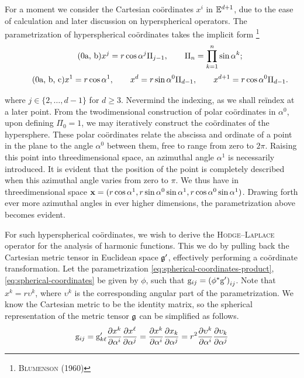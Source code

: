For a moment we consider the Cartesian coördinates $x^{i}$ in $\mathbb{E}^{d+1}$, due to the ease of calculation and later discussion on hyperspherical operators.
The parametrization of hyperspherical coördinates takes the implicit form%
\footnote{%
  \cite{blumenson1960derivation} \textsc{Blumenson} (1960)
}
%
\begin{subequations}\label{eq:spherical-coordinates-product}
  \begin{equation}\tag{\theequation{a, b}}
    x^{j} = r \cos{\alpha^j} \Pi_{j-1}, \qquad \Pi_n = \prod_{k = 1}^{n} \sin{\alpha^k};
  \end{equation}
\end{subequations}
%
\begin{subequations}\label{eq:spherical-coordinates}
  \begin{equation}\tag{\theequation{a, b, c}}
    x^1 = r \cos{\alpha^1}, \qquad x^{d} = r \sin{\alpha^{0}} \Pi_{d-1}, \qquad x^{d+1} = r \cos{\alpha^{0}} \Pi_{d-1}.
  \end{equation}
\end{subequations}

\noindent
where $j \in \{ 2, \dots, d-1 \}$ for $d \geq 3$.
Nevermind the indexing, as we shall reïndex at a later point.
From the twodimensional construction of polar coördinates in $\alpha^0$, upon defining $\Pi_0 = 1$, we may iteratively construct the coördinates of the hypersphere.
These polar coördinates relate the abscissa and ordinate of a point in the plane to the angle $\alpha^0$ between them, free to range from zero to $2\pi$.
Raising this point into threedimensional space, an azimuthal angle $\alpha^1$ is necessarily introduced.
It is evident that the position of the point is completely described when this azimuthal angle varies from zero to $\pi$.
We thus have in threedimensional space $\mathbf{x} = (r\cos{\alpha^1}, r\sin{\alpha^0}\sin{\alpha^1}, r\cos{\alpha^0}\sin{\alpha^1})$.
Drawing forth ever more azimuthal angles in ever higher dimensions, the parametrization above becomes evident.

For such hyperspherical coördinates, we wish to derive the \textsc{Hodge}--\textsc{Laplace} operator for the analysis of harmonic functions.
This we do by pulling back the Cartesian metric tensor in Euclidean space $\mathfrak{g}^{\prime}$, effectively performing a coördinate transformation.
Let the parametrization \eqref{eq:spherical-coordinates-product}, \eqref{eq:spherical-coordinates} be given by $\phi$, such that $\mathrm{g}_{ij} = {(\phi^{\ast} \mathrm{g}^{\prime})}_{ij}$.
Note that $x^{k} = r \upsilon^{k}$, where $\upsilon^k$ is the corresponding angular part of the parametrization.
We know the Cartesian metric to be the identity matrix, so the spherical representation of the metric tensor $\mathfrak{g}$ can be simplified as follows.
%
\begin{equation}\label{eq:spherical-metric-tensorI}
  \mathrm{g}_{ij} = \mathrm{g}^{\prime}_{k\ell}\frac{\partial x^{k}}{\partial\alpha^i} \frac{\partial x^{\ell}}{\partial\alpha^j} = \frac{\partial x^{k}}{\partial\alpha^i} \frac{\partial x_{k}}{\partial\alpha^j} = r^2 \frac{\partial\upsilon^{k}}{\partial\alpha^{i}} \frac{\partial\upsilon_{k}}{\partial\alpha^{j}}
\end{equation}

